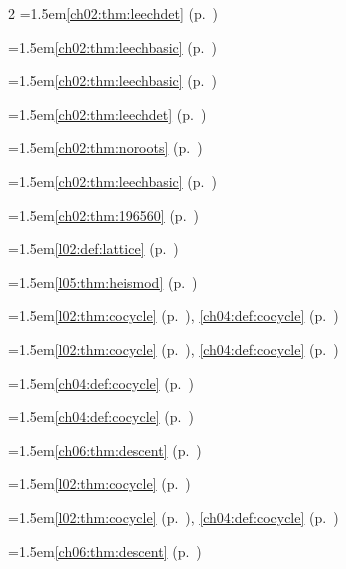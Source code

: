 \begin{multicols}{2}
\hangindent=1.5em\quad \ref{ch02:thm:leechdet} (p.~\pageref{ch02:thm:leechdet})\par
\hangindent=1.5em\quad \ref{ch02:thm:leechbasic} (p.~\pageref{ch02:thm:leechbasic})\par
\hangindent=1.5em\quad \ref{ch02:thm:leechbasic} (p.~\pageref{ch02:thm:leechbasic})\par
\hangindent=1.5em\quad \ref{ch02:thm:leechdet} (p.~\pageref{ch02:thm:leechdet})\par
\hangindent=1.5em\quad \ref{ch02:thm:noroots} (p.~\pageref{ch02:thm:noroots})\par
\hangindent=1.5em\quad \ref{ch02:thm:leechbasic} (p.~\pageref{ch02:thm:leechbasic})\par
\hangindent=1.5em\quad \ref{ch02:thm:196560} (p.~\pageref{ch02:thm:196560})\par
\hangindent=1.5em\quad \ref{l02:def:lattice} (p.~\pageref{l02:def:lattice})\par
\hangindent=1.5em\quad \ref{l05:thm:heismod} (p.~\pageref{l05:thm:heismod})\par
\hangindent=1.5em\quad \ref{l02:thm:cocycle} (p.~\pageref{l02:thm:cocycle}), \ref{ch04:def:cocycle} (p.~\pageref{ch04:def:cocycle})\par
\hangindent=1.5em\quad \ref{l02:thm:cocycle} (p.~\pageref{l02:thm:cocycle}), \ref{ch04:def:cocycle} (p.~\pageref{ch04:def:cocycle})\par
\hangindent=1.5em\quad \ref{ch04:def:cocycle} (p.~\pageref{ch04:def:cocycle})\par
\hangindent=1.5em\quad \ref{ch04:def:cocycle} (p.~\pageref{ch04:def:cocycle})\par
\hangindent=1.5em\quad \ref{ch06:thm:descent} (p.~\pageref{ch06:thm:descent})\par
\hangindent=1.5em\quad \ref{l02:thm:cocycle} (p.~\pageref{l02:thm:cocycle})\par
\hangindent=1.5em\quad \ref{l02:thm:cocycle} (p.~\pageref{l02:thm:cocycle}), \ref{ch04:def:cocycle} (p.~\pageref{ch04:def:cocycle})\par
\hangindent=1.5em\quad \ref{ch06:thm:descent} (p.~\pageref{ch06:thm:descent})\par

\end{multicols}
